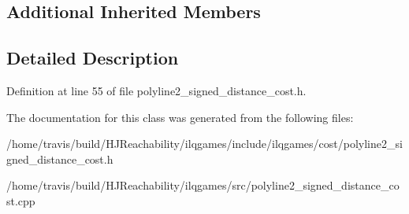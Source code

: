 \subsection*{Additional Inherited Members}


\subsection{Detailed Description}


Definition at line 55 of file polyline2\+\_\+signed\+\_\+distance\+\_\+cost.\+h.



The documentation for this class was generated from the following files\+:\begin{DoxyCompactItemize}
\item 
/home/travis/build/\+H\+J\+Reachability/ilqgames/include/ilqgames/cost/polyline2\+\_\+signed\+\_\+distance\+\_\+cost.\+h\item 
/home/travis/build/\+H\+J\+Reachability/ilqgames/src/polyline2\+\_\+signed\+\_\+distance\+\_\+cost.\+cpp\end{DoxyCompactItemize}
